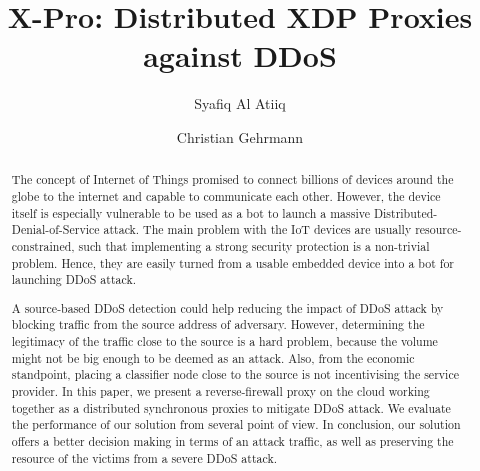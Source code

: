 \documentclass[sigplan,screen]{acmart}
\begin{document}
\title{X-Pro: Distributed XDP Proxies against DDoS}

\author{Syafiq Al Atiiq}
\author{Christian Gehrmann}

\begin{abstract}
The concept of Internet of Things promised to connect billions of devices around the globe to the internet and capable to communicate each other. However, the device itself is especially vulnerable to be used as a bot to launch a massive Distributed-Denial-of-Service attack. The main problem with the IoT devices are usually resource-constrained, such that implementing a strong security protection is a non-trivial problem. Hence, they are easily turned from a usable embedded device into a bot for launching DDoS attack. 

A source-based DDoS detection could help reducing the impact of DDoS attack by blocking traffic from the source address of adversary. However, determining the legitimacy of the traffic close to the source is a hard problem, because the volume might not be big enough to be deemed as an attack. Also, from the economic standpoint, placing a classifier node close to the source is not incentivising the service provider. In this paper, we present a reverse-firewall proxy on the cloud working together as a distributed synchronous proxies to mitigate DDoS attack. We evaluate the performance of our solution from several point of view. In conclusion, our solution offers a better decision making in terms of an attack traffic, as well as preserving the resource of the victims from a severe DDoS attack.  
\end{abstract}

\end{document}
